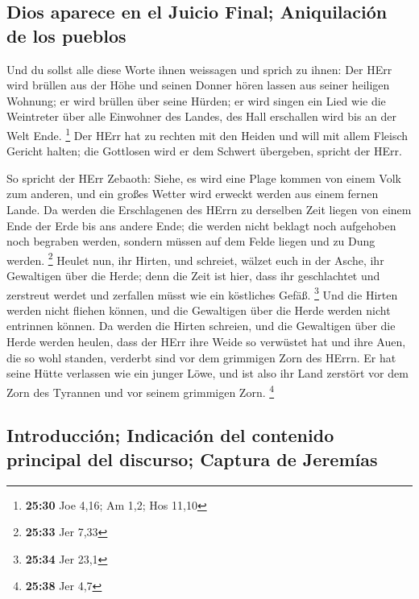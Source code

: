 \hypertarget{dios-aparece-en-el-juicio-final-aniquilaciuxf3n-de-los-pueblos}{%
\subsection{Dios aparece en el Juicio Final; Aniquilación de los
pueblos}\label{dios-aparece-en-el-juicio-final-aniquilaciuxf3n-de-los-pueblos}}

 Und du sollst alle diese Worte ihnen weissagen und
sprich zu ihnen: Der HErr wird brüllen aus der Höhe und seinen Donner
hören lassen aus seiner heiligen Wohnung; er wird brüllen über seine
Hürden; er wird singen ein Lied wie die Weintreter über alle Einwohner
des Landes, des Hall erschallen wird bis an der Welt Ende. \footnote{\textbf{25:30}
  Joe 4,16; Am 1,2; Hos 11,10}  Der HErr hat zu rechten
mit den Heiden und will mit allem Fleisch Gericht halten; die Gottlosen
wird er dem Schwert übergeben, spricht der HErr.

 So spricht der HErr Zebaoth: Siehe, es wird eine Plage
kommen von einem Volk zum anderen, und ein großes Wetter wird erweckt
werden aus einem fernen Lande.  Da werden die
Erschlagenen des HErrn zu derselben Zeit liegen von einem Ende der Erde
bis ans andere Ende; die werden nicht beklagt noch aufgehoben noch
begraben werden, sondern müssen auf dem Felde liegen und zu Dung werden.
\footnote{\textbf{25:33} Jer 7,33}  Heulet nun, ihr
Hirten, und schreiet, wälzet euch in der Asche, ihr Gewaltigen über die
Herde; denn die Zeit ist hier, dass ihr geschlachtet und zerstreut
werdet und zerfallen müsst wie ein köstliches Gefäß. \footnote{\textbf{25:34}
  Jer 23,1}  Und die Hirten werden nicht fliehen können,
und die Gewaltigen über die Herde werden nicht entrinnen können.
 Da werden die Hirten schreien, und die Gewaltigen über
die Herde werden heulen, dass der HErr ihre Weide so verwüstet hat
 und ihre Auen, die so wohl standen, verderbt sind vor
dem grimmigen Zorn des HErrn.  Er hat seine Hütte
verlassen wie ein junger Löwe, und ist also ihr Land zerstört vor dem
Zorn des Tyrannen und vor seinem grimmigen Zorn. \footnote{\textbf{25:38}
  Jer 4,7}

\hypertarget{introducciuxf3n-indicaciuxf3n-del-contenido-principal-del-discurso-captura-de-jeremuxedas}{%
\subsection{Introducción; Indicación del contenido principal del
discurso; Captura de
Jeremías}\label{introducciuxf3n-indicaciuxf3n-del-contenido-principal-del-discurso-captura-de-jeremuxedas}}

